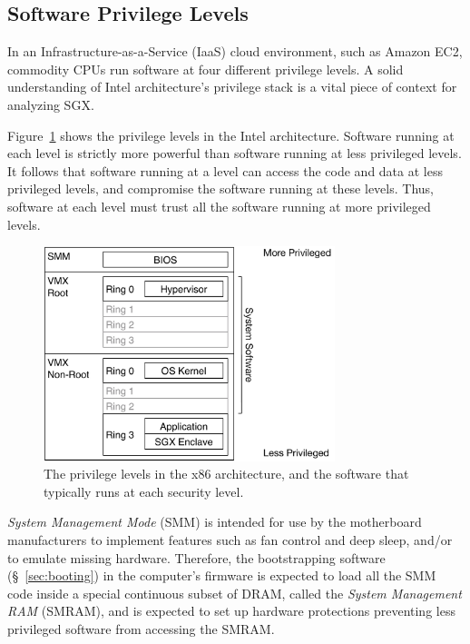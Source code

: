 \subsection{Software Privilege Levels}
\label{sec:rings}

In an Infrastructure-as-a-Service (IaaS) cloud environment, such as Amazon EC2,
commodity CPUs run software at four different privilege levels. A solid
understanding of Intel architecture's privilege stack is a vital piece of
context for analyzing SGX.

Figure~\ref{fig:cpu_rings} shows the privilege levels in the Intel
architecture. Software running at each level is strictly more powerful than
software running at less privileged levels. It follows that software running at
a level can access the code and data at less privileged levels, and compromise
the software running at these levels. Thus, software at each level must trust
all the software running at more privileged levels.

\begin{figure}[hbtp]
  \centering
  \includegraphics[width=85mm]{figures/cpu_rings.pdf}
  \caption{
    The privilege levels in the x86 architecture, and the software that
    typically runs at each security level.
  }
  \label{fig:cpu_rings}
\end{figure}


\textit{System Management Mode} (SMM) is intended for use by the motherboard
manufacturers to implement features such as fan control and deep sleep, and/or
to emulate missing hardware. Therefore, the bootstrapping software
(\S~\ref{sec:booting}) in the computer's firmware is expected to load all the
SMM code inside a special continuous subset of DRAM, called the \textit{System
Management RAM} (SMRAM), and is expected to set up hardware protections
preventing less privileged software from accessing the SMRAM.

